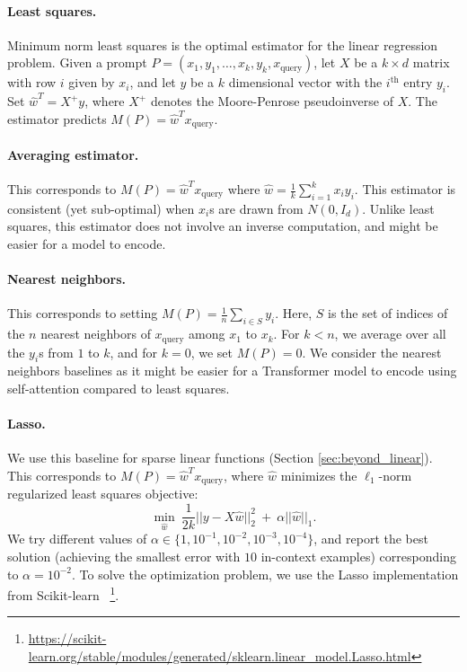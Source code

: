 \documentclass{article}
\begin{document}
\paragraph{Least squares.} Minimum norm least squares is the optimal estimator for the linear regression problem. Given a prompt $P = (x_1, y_1, \ldots, x_k, y_k, x_{\text{query}})$, let $X$ be a $k \times d$ matrix with row $i$ given by $x_i$, and let $y$ be a $k$ dimensional vector with the $i^{\text{th}}$ entry $y_i$. Set $\hat{w}^T  = X^{+} y$, where $X^{+}$ denotes the Moore-Penrose pseudoinverse of $X$. The estimator predicts $M(P) = \hat{w}^T x_{\text{query}}$.

\paragraph{Averaging estimator.} This corresponds to $M(P) = \hat{w}^T x_{\text{query}}$ where $\hat{w} = \frac{1}{k} \sum_{i=1}^k x_i y_i$. This estimator is consistent (yet sub-optimal) when $x_i$s are drawn from $N(0, I_d)$. Unlike least squares, this estimator does not involve an inverse computation, and might be easier for a model to encode.

\paragraph{Nearest neighbors.} This corresponds to setting $M(P) = \frac{1}{n} \sum_{i \in S} y_i$. Here, $S$ is the set of indices of the $n$ nearest neighbors of $x_{\text{query}}$ among $x_1$ to $x_k$. For $k < n$, we average over all the $y_i$s from $1$ to $k$, and for $k=0$, we set $M(P) = 0$. 
We consider the nearest neighbors baselines as it might be easier for a Transformer model to encode using self-attention compared to least squares.

\paragraph{Lasso.} We use this baseline for sparse linear functions (Section \ref{sec:beyond_linear}). This corresponds to $M(P) = \hat{w}^T x_{\text{query}}$, where $\hat{w}$ minimizes the $\ell_1$-norm regularized least squares objective:
\[
\min_{\hat{w}} ~ \frac{1}{2k}|| y - X\hat{w}||_2^2 ~ + ~ \alpha ||\hat{w}||_1.
\]
 We try different values of $\alpha \in \{ 1, 10^{-1}, 10^{-2}, 10^{-3}, 10^{-4} \}$, and report the best solution (achieving the smallest error with $10$ in-context examples) corresponding to $\alpha = 10^{-2}$. To solve the optimization problem, we use the Lasso implementation from Scikit-learn \citep{scikit-learn}
 ~\footnote{\scriptsize\url{https://scikit-learn.org/stable/modules/generated/sklearn.linear_model.Lasso.html}}.
\end{document}
